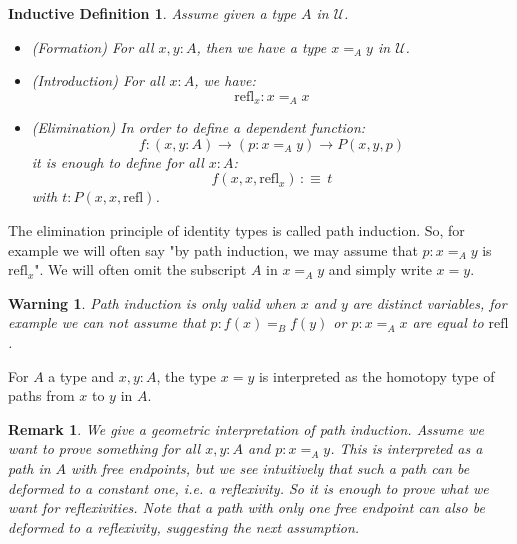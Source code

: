 \documentclass{article}
\newcommand{\U}{{\mathcal U}}
\renewcommand{\r}{\rightarrow}
\newcommand{\refl}{\mathrm{refl}}
\newtheorem{remark}{Remark}
\newtheorem{ind_def}{Inductive Definition}
\newtheorem{warning}{\danger Warning}
\begin{document}
\begin{ind_def}
Assume given a type $A$ in $\U$.%
\begin{itemize}
\item (Formation) For all $x,y:A$, then we have a type $x=_A y$ in $\U$.
\item (Introduction) For all $x:A$, we have:
\[\refl_x : x=_Ax\]
\item (Elimination) In order to define a dependent function: 
\[f : (x,y:A)\r (p:x=_Ay)\r P(x,y,p)\] 
it is enough to define for all $x:A$:
\[f(x,x,\refl_x)\,:\equiv\, t\]
with $t:P(x,x,\refl)$.

\end{itemize}
\end{ind_def}

The elimination principle of identity types is called path induction. So, for example we will often say "by path induction, we may assume that $p:x=_A y$ is $\refl_x$". We will often omit the subscript $A$ in $x=_Ay$ and simply write $x=y$. 

\begin{warning}
Path induction is only valid when $x$ and $y$ are distinct variables, for example we can not assume that $p:f(x)=_Bf(y)$ or $p:x=_Ax$ are equal to $\refl$.
\end{warning}

For $A$ a type and $x,y:A$, the type $x=y$ is interpreted as the homotopy type of paths from $x$ to $y$ in $A$.

\begin{remark}
We give a geometric interpretation of path induction. Assume we want to prove something for all $x,y:A$ and $p:x=_Ay$. This is interpreted as a path in $A$ with free endpoints, but we see intuitively that such a path can be deformed to a constant one, i.e. a reflexivity. So it is enough to prove what we want for reflexivities. Note that a path with only one free endpoint can also be deformed to a reflexivity, suggesting the next assumption.%
\end{remark}
\end{document}
